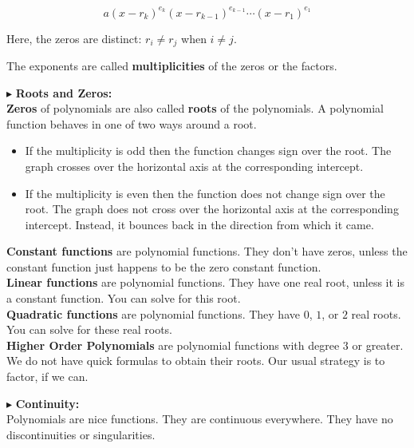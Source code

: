 \documentclass{ximera}
\begin{document}
\[   a (x - r_k)^{e_k} (x - r_{k-1})^{e_{k-1}} \cdots (x - r_1)^{e_1}             \]


Here, the zeros are distinct:  $r_i \ne r_j$ when $i \ne j$.

The exponents are called \textbf{\textcolor{purple!85!blue}{multiplicities}} of the zeros or the factors. 






$\blacktriangleright$   \textbf{\textcolor{red!10!blue!90!}{Roots and Zeros:}} \\ 
\textbf{Zeros} of polynomials are also called \textbf{roots} of the polynomials.  A polynomial function behaves in one of two ways around a root.

\begin{itemize}
\item If the multiplicity is odd then the function changes sign over the root.  The graph crosses over the horizontal axis at the corresponding intercept.
\item If the multiplicity is even then the function does not change sign over the root.  The graph does not cross over the horizontal axis at the corresponding intercept. Instead, it bounces back in the direction from which it came.
\end{itemize}


\textbf{Constant functions} are polynomial functions.  They don't have zeros, unless the constant function just happens to be the zero constant function.  \\


\textbf{Linear functions} are polynomial functions. They have one real root, unless it is a constant function.  You can solve for this root. \\


\textbf{Quadratic functions} are polynomial functions. They have $0$, $1$, or $2$ real roots.  You can solve for these real roots. \\


\textbf{Higher Order Polynomials} are polynomial functions with degree $3$ or greater.  We do not have quick formulas to obtain their roots.  Our usual strategy is to factor, if we can.  





$\blacktriangleright$ \textbf{\textcolor{red!10!blue!90!}{Continuity:}} \\ 
Polynomials are nice functions.  They are continuous everywhere.  They have no discontinuities or singularities.
\end{document}

